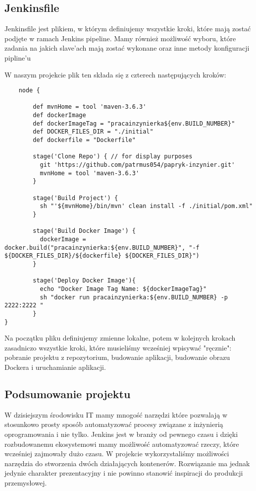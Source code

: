 \subsection{Jenkinsfile} 
Jenkinsfile jest plikiem, w którym definiujemy wszystkie kroki, które mają zostać podjęte w ramach Jenkins pipeline. Mamy również możliwość wyboru, które zadania na jakich slave'ach mają zostać wykonane oraz inne metody konfiguracji pipline'u

W naszym projekcie plik ten składa się z czterech następujących kroków:

\begin{lstlisting}
    node {  
        
	    def mvnHome = tool 'maven-3.6.3'
	    def dockerImage
	    def dockerImageTag = "pracainzynierka${env.BUILD_NUMBER}"
		def DOCKER_FILES_DIR = "./initial"
		def dockerfile = "Dockerfile"
	    
	    stage('Clone Repo') { // for display purposes
	      git 'https://github.com/patrmus054/papryk-inzynier.git'           
	      mvnHome = tool 'maven-3.6.3'
	    }    
	  
	    stage('Build Project') {
	      sh "'${mvnHome}/bin/mvn' clean install -f ./initial/pom.xml"
	    }
			
	    stage('Build Docker Image') {
	      dockerImage = docker.build("pracainzynierka:${env.BUILD_NUMBER}", "-f ${DOCKER_FILES_DIR}/${dockerfile} ${DOCKER_FILES_DIR}")
	    }
	   
	    stage('Deploy Docker Image'){
	      echo "Docker Image Tag Name: ${dockerImageTag}"
		  sh "docker run pracainzynierka:${env.BUILD_NUMBER} -p 2222:2222 "
	    }
}
\end{lstlisting}

Na początku pliku definiujemy zmienne lokalne, potem w kolejnych krokach zasadniczo wszystkie kroki, które musieliśmy wcześniej wpisywać "ręcznie": pobranie projektu z repozytorium, budowanie aplikacji, budowanie obrazu Dockera i uruchamianie aplikacji. 

\subsection{Podsumowanie projektu}

W dzisiejszym środowisku IT mamy mnogość narzędzi które pozwalają w stosunkowo prosty sposób automatyzować procesy związane z inżynierią oprogramowania i nie tylko. Jenkins jest w branży od pewnego czasu i dzięki rozbudowanemu ekosystemowi mamy możliwość automatyzować rzeczy, które wcześniej zajmowały dużo czasu. W projekcie wykorzystaliśmy możliwości narzędzia do stworzenia dwóch działających kontenerów. Rozwiązanie ma jednak jedynie charakter prezentacyjny i nie powinno stanowić inspiracji do produkcji przemysłowej. 
